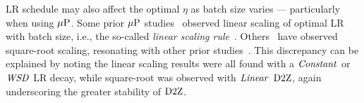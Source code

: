 LR schedule may also affect the optimal $\eta$ as batch size varies
--- particularly when using $\mbox{$\mu$P}$.
%
Some prior $\mbox{$\mu$P}$
studies~\citep{yang2022mup,noci2024learning,shen2024power} observed
linear scaling of optimal LR with batch size, i.e., the
so-called \emph{linear scaling
rule}~\citep{krizhevsky2014one,chen2016revisiting,smith2018dont}.
Others~\citep{lingle2024large} have observed square-root scaling,
resonating with other prior
studies~\citep{hoffer2017train,you2019large,malladi2022sdes}.
This discrepancy can be explained by noting the linear scaling results
were all found with a $\mbox{\emph{Constant}}$ or $\mbox{\emph{WSD}}$ LR decay, while
square-root was observed with $\mbox{\emph{Linear}}$ $\mbox{D2Z}$, again underscoring
the greater stability of $\mbox{D2Z}$.
%
%
%
%
%
%
%

